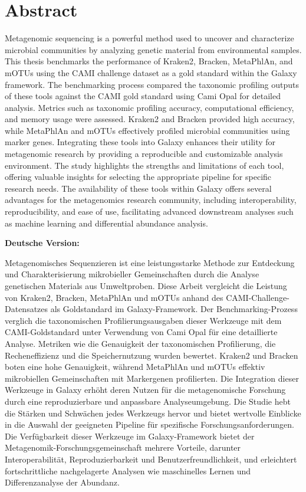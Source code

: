 \chapter*{Abstract}

Metagenomic sequencing is a powerful method used to uncover and characterize microbial communities by analyzing genetic material from environmental samples. This thesis benchmarks the performance of Kraken2, Bracken, MetaPhlAn, and mOTUs using the CAMI challenge dataset as a gold standard within the Galaxy framework.
The benchmarking process compared the taxonomic profiling outputs of these tools against the CAMI gold standard using Cami Opal for detailed analysis. Metrics such as taxonomic profiling accuracy, computational efficiency, and memory usage were assessed. Kraken2 and Bracken provided high accuracy, while MetaPhlAn and mOTUs effectively profiled microbial communities using marker genes.
Integrating these tools into Galaxy enhances their utility for metagenomic research by providing a reproducible and customizable analysis environment. The study highlights the strengths and limitations of each tool, offering valuable insights for selecting the appropriate pipeline for specific research needs.
The availability of these tools within Galaxy offers several advantages for the metagenomics research community, including interoperability, reproducibility, and ease of use, facilitating advanced downstream analyses such as machine learning and differential abundance analysis.

\vspace{1cm}

\textbf{Deutsche Version:}

\vspace{0.5cm}

Metagenomisches Sequenzieren ist eine leistungsstarke Methode zur Entdeckung und Charakterisierung mikrobieller Gemeinschaften durch die Analyse genetischen Materials aus Umweltproben. Diese Arbeit vergleicht die Leistung von Kraken2, Bracken, MetaPhlAn und mOTUs anhand des CAMI-Challenge-Datensatzes als Goldstandard im Galaxy-Framework.
Der Benchmarking-Prozess verglich die taxonomischen Profilierungsausgaben dieser Werkzeuge mit dem CAMI-Goldstandard unter Verwendung von Cami Opal für eine detaillierte Analyse. Metriken wie die Genauigkeit der taxonomischen Profilierung, die Recheneffizienz und die Speichernutzung wurden bewertet. Kraken2 und Bracken boten eine hohe Genauigkeit, während MetaPhlAn und mOTUs effektiv mikrobiellen Gemeinschaften mit Markergenen profilierten.
Die Integration dieser Werkzeuge in Galaxy erhöht deren Nutzen für die metagenomische Forschung durch eine reproduzierbare und anpassbare Analyseumgebung. Die Studie hebt die Stärken und Schwächen jedes Werkzeugs hervor und bietet wertvolle Einblicke in die Auswahl der geeigneten Pipeline für spezifische Forschungsanforderungen.
Die Verfügbarkeit dieser Werkzeuge im Galaxy-Framework bietet der Metagenomik-Forschungsgemeinschaft mehrere Vorteile, darunter Interoperabilität, Reproduzierbarkeit und Benutzerfreundlichkeit, und erleichtert fortschrittliche nachgelagerte Analysen wie maschinelles Lernen und Differenzanalyse der Abundanz.